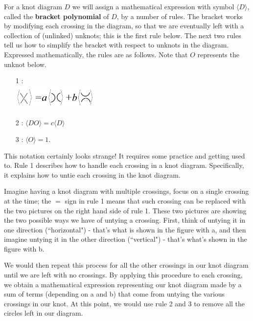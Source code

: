 \documentclass[12 pt]{article}
\begin{document}
For a knot diagram $D$ we will assign a mathematical expression with symbol $\langle D\rangle$, called the \textbf{bracket polynomial} of $D$, by a number of rules. The bracket works by modifying each crossing in the diagram, so that we are eventually left with a collection of (unlinked) unknots; this is the first rule below. The next two rules tell us how to simplify the bracket with respect to unknots in the diagram. Expressed mathematically, the rules are as follows.  Note that $O$ represents the unknot below.
\begin{enumerate}
\item[1]: \\ \includegraphics[height = 0.5in]{bracket_1.jpg}
\item[2]: $\langle D O\rangle = c\langle D\rangle$
\item[3]: $\langle O\rangle = 1$.
\end{enumerate}

This notation certainly looks strange! It requires some practice and getting used to. Rule 1 describes how to handle each crossing in a knot diagram. Specifically, it explains how to untie each crossing in the knot diagram. 

Imagine having a knot diagram with multiple crossings, focus on a single crossing at the time; the $=$ sign in rule 1 means that such crossing can be replaced with the two pictures on the right hand side of rule 1. These two pictures are showing the two possible ways we have of untying a crossing. First, think of untying it in one direction (``horizontal") - that's what is shown in the figure with a, and then imagine untying it in the other direction (``vertical") - that's what's shown in the figure with b. 

We would then repeat this process for all the other crossings in our knot diagram until we are left with no crossings. By applying this procedure to each crossing, we obtain a mathematical expression representing our knot diagram made by a sum of terms (depending on a and b) that come from untying the various crossings in our knot. At this point, we would use rule 2 and 3 to remove all the circles left in our diagram. 
\end{document}
